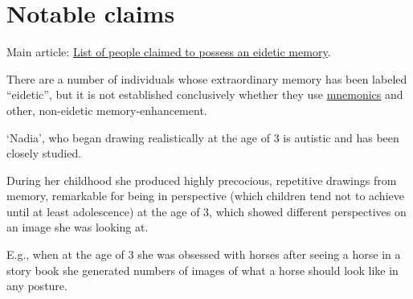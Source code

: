 \documentclass{book}
\numberwithin{equation}{section}
\begin{document}
\section{Notable claims}
Main article: \href{https://en.wikipedia.org/wiki/List_of_people_claimed_to_possess_an_eidetic_memory}{List of people claimed to possess an eidetic memory}.

%
There are a number of individuals whose extraordinary memory has been labeled ``eidetic'', but it is not established conclusively whether they use \href{https://en.wikipedia.org/wiki/Mnemonic}{mnemonics} and other, non-eidetic memory-enhancement.

`Nadia', who began drawing realistically at the age of 3 is autistic and has been closely studied.

During her childhood she produced highly precocious, repetitive drawings from memory, remarkable for being in perspective (which children tend not to achieve until at least adolescence) at the age of 3, which showed different perspectives on an image she was looking at.

E.g., when at the age of 3 she was obsessed with horses after seeing a horse in a story book she generated numbers of images of what a horse should look like in any posture.
\end{document}
